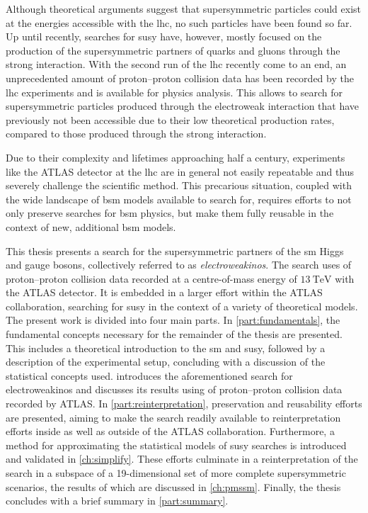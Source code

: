 Although theoretical arguments suggest that supersymmetric particles could exist at the energies accessible with the \gls{lhc}, no such particles have been found so far.
Up until recently, searches for \gls{susy} have, however, mostly focused on the production of the supersymmetric partners of quarks and gluons through the strong interaction.
With the second run of the \gls{lhc} recently come to an end, an unprecedented amount of proton--proton collision data has been recorded by the \gls{lhc} experiments and is available for physics analysis.
This allows to search for supersymmetric particles produced through the electroweak interaction that have previously not been accessible due to their low theoretical production rates, compared to those produced through the strong interaction.

Due to their complexity and lifetimes approaching half a century, experiments like the ATLAS detector at the \gls{lhc} are in general not easily repeatable and thus severely challenge the scientific method.
This precarious situation, coupled with the wide landscape of \gls{bsm} models available to search for, requires efforts to not only preserve searches for \gls{bsm} physics, but make them fully reusable in the context of new, additional \gls{bsm} models. 

This thesis presents a search for the supersymmetric partners of the \gls{sm} Higgs and gauge bosons, collectively referred to as \textit{electroweakinos}. The search uses \onethirtynineifb of proton--proton collision data recorded at a centre-of-mass energy of $\SI{13}{\TeV}$ with the ATLAS detector.
It is embedded in a larger effort within the ATLAS collaboration, searching for \gls{susy} in the context of a variety of theoretical models.
The present work is divided into four main parts.
In \cref{part:fundamentals}, the fundamental concepts necessary for the remainder of the thesis are presented.
This includes a theoretical introduction to the \gls{sm} and \gls{susy}, followed by a description of the experimental setup, concluding with a discussion of the statistical concepts used.
 introduces the aforementioned search for electroweakinos and discusses its results using \onethirtynineifb of proton--proton collision data recorded by ATLAS.
In \cref{part:reinterpretation}, preservation and reusability efforts are presented, aiming to make the search readily available to reinterpretation efforts inside as well as outside of the ATLAS collaboration.
Furthermore, a method for approximating the statistical models of \gls{susy} searches is introduced and validated in \cref{ch:simplify}. These efforts culminate in a reinterpretation of the search in a subspace of a 19-dimensional set of more complete supersymmetric scenarios, the results of which are discussed in \cref{ch:pmssm}.
Finally, the thesis concludes with a brief summary in \cref{part:summary}.

